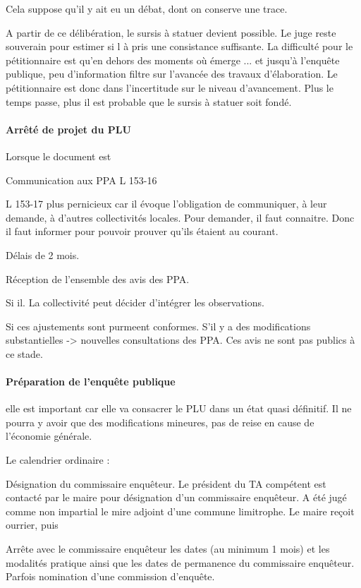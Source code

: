 		Cela suppose qu'il y ait eu un débat, dont on conserve une trace. 
		
		A partir de ce délibération, le sursis à statuer devient possible. Le juge reste souverain pour estimer si l à pris une consistance suffisante. La difficulté pour le pétitionnaire est qu'en dehors des moments où émerge ... et jusqu'à l'enquête publique, peu d'information filtre sur l'avancée des travaux d'élaboration. Le pétitionnaire est donc dans l'incertitude sur le niveau d'avancement. Plus le temps passe, plus il est probable que le sursis à statuer soit fondé.
		
		\paragraph{Arrêté de projet du PLU } Lorsque le document est 
		
		Communication aux PPA L 153-16
		
		L 153-17 plus pernicieux car il évoque l'obligation de communiquer, à leur demande, à d'autres collectivités locales. Pour demander, il faut connaitre. Donc il faut informer pour pouvoir prouver qu'ils étaient au courant.
		
		Délais de 2 mois.
		
		Réception de l'ensemble des avis des PPA.
		
		Si il. La collectivité peut décider d'intégrer les observations.
		
		Si ces ajustements sont purmeent conformes. S'il y a des modifications substantielles -> nouvelles consultations des PPA. Ces avis ne sont pas publics à ce stade.
		
		\paragraph{Préparation de l'enquête publique}
		
		elle est important car elle va consacrer le PLU dans un état quasi définitif. Il ne pourra y avoir que des modifications mineures, pas de reise en cause de l'économie générale.
		
		Le calendrier ordinaire : 
		
		Désignation du commissaire enquêteur. Le président du TA compétent est contacté par le maire pour désignation d'un commissaire enquêteur. 
		A été jugé comme non impartial le mire adjoint d'une commune limitrophe.
		Le maire reçoit ourrier, puis
		
		Arrête avec le commissaire enquêteur les dates (au minimum 1 mois) et les modalités pratique ainsi que les dates de permanence du commissaire enquêteur. Parfois nomination d'une commission d'enquête.
		
